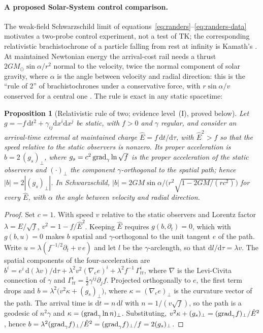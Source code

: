 \documentclass[12pt]{iopart}
\theoremstyle{plain}
\newtheorem{proposition}{Proposition}
\theoremstyle{definition}
\theoremstyle{remark}
\newcommand{\Ehat}{\hat E}
\newcommand{\dd}{\mathrm{d}}
\begin{document}
\paragraph{A proposed Solar-System control comparison.}
\label{par:obs-solar-probe}
The weak-field Schwarzschild limit of
equations~\eqref{eq:randers}--\eqref{eq:randers-data} motivates a two-probe
control experiment, not a test of TK; the corresponding relativistic
brachistochrone of a particle falling from rest at infinity is Kamath's
\cite{Kamath1988}. At maintained Newtonian energy the
arrival-cost rail needs a thrust $2GM_\odot\sin\alpha/r^2$ normal to the
velocity, twice the normal component of solar gravity, where $\alpha$ is the
angle between velocity and radial direction: this is the ``rule of 2'' of
brachistochrones under a conservative force, with $r\sin\alpha/v$ conserved for
a central one \cite{Routh1898,AgmonMann2026}. The rule is exact in any static spacetime:
\begin{proposition}[Relativistic rule of two; evidence level~(I), proved below]
\label{prop:rule-of-two}
Let $g=-f\,\dd t^2+\gamma_{ij}\dd x^i\dd x^j$ be static, with $f>0$ and $\gamma$ regular, and
consider an arrival-time extremal at maintained charge $\Ehat=f\,\dd t/\dd\tau$, with
$\Ehat^2>f$ so that the speed relative to the static observers is nonzero. Its proper
acceleration is $b=2\,(g_s)_\perp$, where $g_s=c^2\,{\rm grad}_\gamma\ln\sqrt f$ is the proper
acceleration of the static observers and $(\cdot)_\perp$ the component $\gamma$-orthogonal to
the spatial path; hence $|b|=2|(g_s)_\perp|$. In Schwarzschild,
$|b|=2GM\sin\alpha/\bigl(r^2\sqrt{1-2GM/(rc^2)}\bigr)$ for every $\Ehat$, with $\alpha$ the
angle between velocity and radial direction.
\end{proposition}
\begin{proof}
Set $c=1$. With speed $v$ relative to the static observers and Lorentz factor
$\lambda=\Ehat/\sqrt f$, $v^2=1-f/\Ehat^2$. Keeping $\Ehat$ requires $g(b,\partial_t)=0$,
which with $g(b,u)=0$ makes $b$ spatial and $\gamma$-orthogonal to the unit tangent $e$ of the
path. Write $u=\lambda(f^{-1/2}\partial_t+v\,e)$ and let $l$ be the $\gamma$-arclength, so that
$\dd l/\dd\tau=\lambda v$. The spatial components of the four-acceleration are
$b^i=e^i\,\dd(\lambda v)/\dd\tau+\lambda^2v^2(\nabla_ee)^i+\lambda^2f^{-1}\,\Gamma^i_{tt}$,
where $\nabla$ is the Levi-Civita connection of $\gamma$ and
$\Gamma^i_{tt}=\tfrac12\gamma^{ij}\partial_jf$. Projected orthogonally to $e$, the first term
drops and $b=\lambda^2\bigl(v^2\kappa+(g_s)_\perp\bigr)$, where $\kappa=(\nabla_ee)_\perp$ is
the curvature vector of the path. The arrival time is $\dd t=n\,\dd l$ with
$n=1/(v\sqrt f)$, so the path is a geodesic of $n^2\gamma$ and
$\kappa=({\rm grad}_\gamma\ln n)_\perp$. Substituting,
$v^2\kappa+(g_s)_\perp=({\rm grad}_\gamma f)_\perp/\Ehat^2$, hence
$b=\lambda^2({\rm grad}_\gamma f)_\perp/\Ehat^2=({\rm grad}_\gamma f)_\perp/f=2(g_s)_\perp$.
\end{proof}
\end{document}
